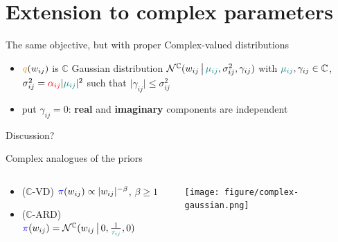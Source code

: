 \documentclass{beamer}
\newcommand{\cplx}{\mathbb{C}}
\begin{document}


\section{Extension to complex parameters} %
\label{sec:extension_to_complex_parameters}

\begin{frame}[c]{\insertsection}
The same objective, but with proper Complex-valued distributions
\begin{itemize}
  \item $
    {\color{orange} q}(w_{ij})
  $ is $\cplx$ Gaussian distribution $
    \mathcal{N}^{\cplx}(
      w_{ij}\,\big\vert\,
      {\color{teal} \mu_{ij}},
      \sigma^2_{ij},
      \gamma_{ij}
    )
  $ with $
    {\color{teal} \mu_{ij}}, \gamma_{ij} \in \cplx
  $, $
    \sigma^2_{ij}
      = {\color{red} \alpha_{ij}}
        \lvert {\color{teal} \mu_{ij}} \rvert^2
  $ such that $\lvert \gamma_{ij}\rvert \leq \sigma^2_{ij}$
  \item put $\gamma_{ij} = 0$: 
    \textbf{real} and \textbf{imaginary} components are independent
\end{itemize} 

Discussion?

\medskip
Complex analogues of the priors
\begin{columns}[T]
  \begin{column}{0.63\linewidth}
    \begin{itemize}
      \item ($\cplx$-VD) $
        {\color{blue} \pi}(w_{ij})
            \propto \lvert w_{ij}\rvert^{-\beta}
      $, $\beta \geq 1$
      \smallskip
      \item ($\cplx$-ARD) $
        {\color{blue} \pi}(w_{ij})
            = \mathcal{N}^{\cplx}(
              w_{ij}\,\big\vert\,
              0, \tfrac1{{\color{teal} \tau_{ij}}}, 0
            )
      $
    \end{itemize}
  \end{column}
  \begin{column}{0.35\linewidth}
    \texttt{[image: figure/complex-gaussian.png]}
  \end{column}
\end{columns}

\end{frame}

\end{document}
